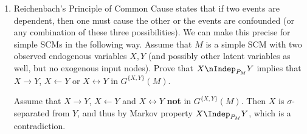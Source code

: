 \begin{enumerate}
	\item %
	Reichenbach's Principle of Common Cause states that if two events are dependent,
	then one must cause the other or the events are confounded (or any combination of these three possibilities).
	We can make this precise for simple SCMs in the following way. Assume that $M$
	is a simple SCM with two observed endogenous variables $X,Y$ (and possibly other
	latent variables as well, but no exogenous input nodes). Prove that
	$X \nIndep_{P_{M}} Y$
	implies that $X \to Y$,
	$X \leftarrow Y$ or $X \leftrightarrow Y$ in $G^{\{X,Y\}}(M)$.

	\begin{ungradedsolution}
		Assume that $X \to Y$, $X \leftarrow Y$ and $X \leftrightarrow Y$ \textbf{not} in $G^{\{X,Y\}}(M)$. Then $X$ is $\sigma$-separated from $Y$, and thus by Markov property $X \Indep_{P_{M}} Y$, which is a contradiction.
	\end{ungradedsolution}
\end{enumerate}


